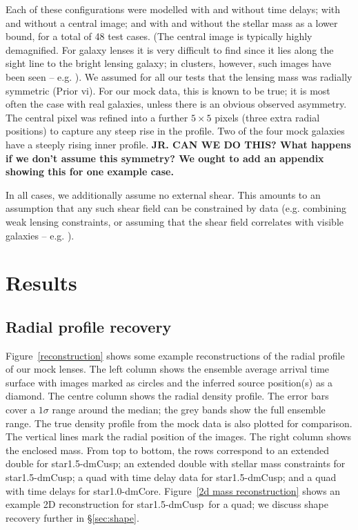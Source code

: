 \documentclass[galley,usenatbib]{mn2e}
\newcommand{\hilight}[1]{{\bf \color{red} #1}}
\newcommand{\figref}[1] {Figure~\ref{#1}}
\newcommand{\mockAA}{{\sc star1.0-dmCore}}
\newcommand{\mockBC}{{\sc star1.5-dmCusp}}
\begin{document}
Each of these configurations were modelled with and without time delays; with
and without a central image; and with and without the stellar mass as a lower
bound, for a total of 48 test cases. (The central image is typically highly
demagnified. For galaxy lenses it is very difficult to find since it lies along
the sight line to the bright lensing galaxy; in clusters, however, such images
have been seen -- e.g. \citealt{2005PASJ...57L...7I}). We assumed for all our tests that the
lensing mass was radially symmetric (Prior vi). For our mock data, this is
known to be true; it is most often the case with real galaxies, unless there is
an obvious observed asymmetry. The central pixel was refined into a further
$5\times5$ pixels (three extra radial positions) to capture any steep rise in
the profile.  Two of the four mock galaxies have a steeply rising inner
profile. \hilight{JR.  CAN WE DO THIS? What happens if we don't assume this symmetry? We ought
to add an appendix showing this for one example case.}

In all cases, we additionally assume no external shear. This amounts to an assumption that any such shear field can be constrained by data (e.g. combining weak lensing constraints, or assuming that the shear field correlates with visible galaxies -- e.g. \citealt{2009A&A...500..681M,2011ApJ...726...84W}).

\section{Results}\label{sec:results}

\subsection{Radial profile recovery}

\figref{reconstruction} shows some example reconstructions of the radial profile of our mock lenses. The left
column shows the ensemble average arrival time surface with images marked as
circles and the inferred source position(s) as a diamond. The centre column shows
the radial density profile. The error bars cover a $1\sigma$ range around the
median; the grey bands show the full ensemble range. The true density profile from the mock data is also plotted for
comparison. The vertical lines mark the radial position of the images. The
right column shows the enclosed mass. From top to bottom, the rows correspond
to an extended double for \mockBC; an extended double with stellar mass
constraints for \mockBC; a quad with time delay data for \mockBC; and a quad
with time delays for \mockAA. \figref{2d mass reconstruction} shows an example
2D reconstruction for \mockBC\ for a quad; we discuss shape recovery further in
\S\ref{sec:shape}.
\end{document}
